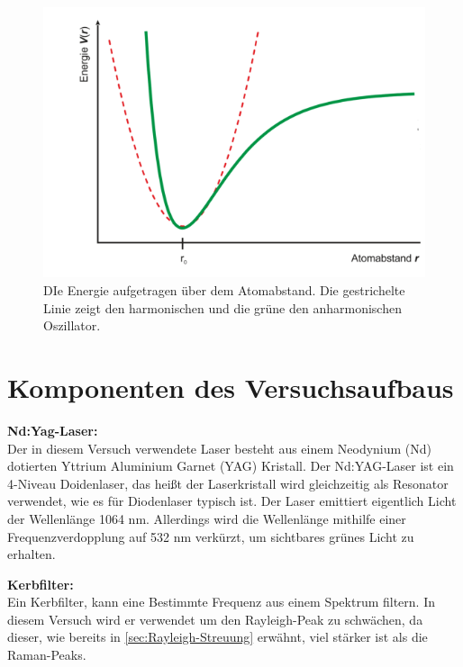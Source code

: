 \documentclass[.../bericht]{subfilies}
\begin{document}
    \begin{figure}[tb]
      \centering
      \includegraphics[scale=0.5]{figures/oszillator}
      \caption{DIe Energie aufgetragen über dem Atomabstand. Die gestrichelte Linie zeigt den harmonischen und die grüne den anharmonischen Oszillator. \cite{schwingungsspek}}
      \label{fig:oszillator}
    \end{figure}

  \section{Komponenten des Versuchsaufbaus}

    \textbf{Nd:Yag-Laser:}\\
    Der in diesem Versuch verwendete Laser besteht aus einem Neodynium (Nd) dotierten Yttrium Aluminium Garnet (YAG) Kristall. Der Nd:YAG-Laser ist ein 4-Niveau Doidenlaser, das heißt der Laserkristall wird  gleichzeitig als Resonator verwendet, wie es für Diodenlaser typisch ist. Der Laser emittiert eigentlich Licht der Wellenlänge 1064 nm. Allerdings wird die Wellenlänge mithilfe einer Frequenzverdopplung auf 532 nm verkürzt, um sichtbares grünes Licht zu erhalten.\\
    \cite{ndyag}
    \medskip

    \textbf{Kerbfilter:}\\
    Ein Kerbfilter, kann eine Bestimmte Frequenz aus einem Spektrum filtern. In diesem Versuch wird er verwendet um den Rayleigh-Peak zu schwächen, da dieser, wie bereits in \cref{sec:Rayleigh-Streuung} erwähnt, viel stärker ist als die Raman-Peaks.\\
    \cite{wiki:kerbfilter}
    \medskip
\end{document}
